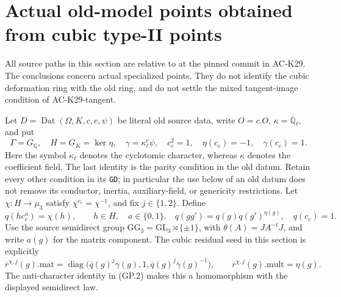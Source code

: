 \section{Actual old-model points obtained from cubic type-II points}
\label{sec:cubic-typeii-point}

All source paths in this section are relative to
at the pinned commit in AC-K29.  The conclusions concern actual
specialized points.  They do not identify the cubic deformation ring
with the old ring, and do not settle the mixed tangent-image condition
of AC-K29-tangent.

Let $D=\operatorname{Dat}(\Omega,K,c,e,\psi)$ be literal old source
data, write $O=c.O$, $\kappa=\overline{\mathbb Q}_\ell$, and put
\[
 \Gamma=G_{\mathbb Q},\quad H=G_K=\ker\eta,\quad
 \gamma=\kappa_\ell^e\psi,\quad c_c^2=1,\quad
 \eta(c_c)=-1,\quad \gamma(c_c)=1.                         \tag{GP.1}
\]
Here the symbol $\kappa_\ell$ denotes the cyclotomic character,
whereas $\kappa$ denotes the coefficient field.  The last identity
is the parity condition in the old datum.  Retain every other
condition in its \texttt{GD}; in particular the use below of an old
datum does not remove its conductor, inertia, auxiliary-field, or
genericity restrictions.
Let $\chi:H\to\mu_3$ satisfy $\chi^{c_c}=\chi^{-1}$, and fix
$j\in\{1,2\}$.  Define
\[
 q(hc_c^a)=\chi(h),\qquad h\in H,\quad a\in\{0,1\}.
 \quad q(gg')=q(g)q(g')^{\eta(g)},\quad q(c_c)=1.           \tag{GP.2}
\]
Use the source semidirect group
$\mathrm{GG}_3=\mathrm{GL}_3\rtimes\{\pm1\}$, with
$\theta(A)=J A^{-t}J$, and write $a(g)$ for the matrix component.
The cubic residual seed in this section is explicitly
\[
 \overline r^{\chi,j}(g).\mathrm{mat}
  =\operatorname{diag}\bigl(\overline q(g)^j\overline\gamma(g),
           1,\overline q(g)^j\overline\gamma(g)^{-1}\bigr),
 \qquad \overline r^{\chi,j}(g).\mathrm{mult}=\eta(g).
                                                               \tag{GP.3}
\]
The anti-character identity in (GP.2) makes this a homomorphism
with the displayed semidirect law.

